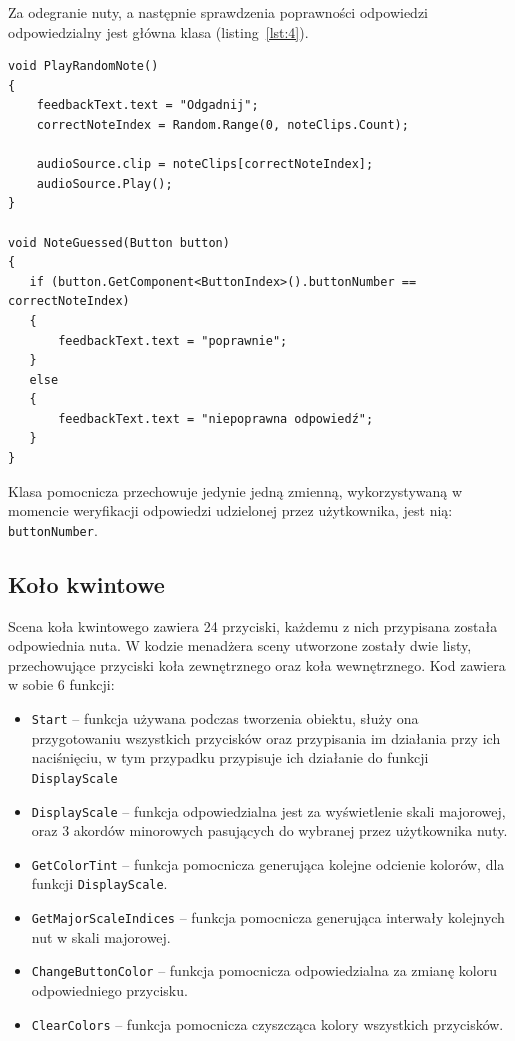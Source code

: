Za odegranie nuty, a następnie sprawdzenia poprawności odpowiedzi odpowiedzialny jest główna klasa (listing~\ref{lst:4}).

\begin{lstlisting}[style=sharpcstyle,caption=Funkcje \texttt{PlayRandomNote} i \texttt{NoteGuessed}, label=lst:4]
void PlayRandomNote()
{
    feedbackText.text = "Odgadnij"; 
    correctNoteIndex = Random.Range(0, noteClips.Count);
    
    audioSource.clip = noteClips[correctNoteIndex];
    audioSource.Play();
}

void NoteGuessed(Button button)
{
   if (button.GetComponent<ButtonIndex>().buttonNumber == correctNoteIndex)
   {
       feedbackText.text = "poprawnie";
   }
   else
   {
       feedbackText.text = "niepoprawna odpowiedź";
   }
}
\end{lstlisting}

Klasa pomocnicza przechowuje jedynie jedną zmienną, wykorzystywaną w momencie weryfikacji odpowiedzi udzielonej przez użytkownika, jest nią: \texttt{buttonNumber}.

\subsection{Koło kwintowe}

Scena koła kwintowego zawiera 24 przyciski, każdemu z nich przypisana została odpowiednia nuta. W kodzie menadżera sceny utworzone zostały dwie listy, przechowujące przyciski koła zewnętrznego oraz koła wewnętrznego. Kod zawiera w sobie 6 funkcji:

\begin{itemize}
\item \texttt{Start} -- funkcja używana podczas tworzenia obiektu, służy ona przygotowaniu wszystkich przycisków oraz przypisania im działania przy ich naciśnięciu, w tym przypadku przypisuje ich działanie do funkcji \texttt{DisplayScale}
\item \texttt{DisplayScale} -- funkcja odpowiedzialna jest za wyświetlenie skali majorowej, oraz 3 akordów minorowych pasujących do wybranej przez użytkownika nuty. 
\item \texttt{GetColorTint} -- funkcja pomocnicza generująca kolejne odcienie kolorów, dla funkcji \texttt{DisplayScale}.
\item \texttt{GetMajorScaleIndices} -- funkcja pomocnicza generująca interwały kolejnych nut w skali majorowej.
\item \texttt{ChangeButtonColor} -- funkcja pomocnicza odpowiedzialna za zmianę koloru odpowiedniego przycisku.
\item \texttt{ClearColors} -- funkcja pomocnicza czyszcząca kolory wszystkich przycisków.
\end{itemize}

